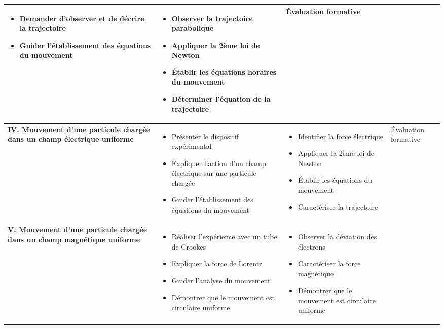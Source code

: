\documentclass[12pt]{article}
\begin{document}
\begin{table}[htbp]
\begin{tabular}{|p{4cm}|p{5.5cm}|p{5.5cm}|p{1.5cm}|}
\begin{itemize}
    \item Demander d'observer et de décrire la trajectoire
    \item Guider l'établissement des équations du mouvement
\end{itemize} & 
\begin{itemize}
    \item Observer la trajectoire parabolique
    \item Appliquer la 2ème loi de Newton
    \item Établir les équations horaires du mouvement
    \item Déterminer l'équation de la trajectoire
\end{itemize} &
Évaluation formative \\
\hline
\textbf{IV. Mouvement d'une particule chargée dans un champ électrique uniforme} & 
\begin{itemize}
    \item Présenter le dispositif expérimental
    \item Expliquer l'action d'un champ électrique sur une particule chargée
    \item Guider l'établissement des équations du mouvement
\end{itemize} & 
\begin{itemize}
    \item Identifier la force électrique
    \item Appliquer la 2ème loi de Newton
    \item Établir les équations du mouvement
    \item Caractériser la trajectoire
\end{itemize} &
Évaluation formative \\
\hline
\textbf{V. Mouvement d'une particule chargée dans un champ magnétique uniforme} & 
\begin{itemize}
    \item Réaliser l'expérience avec un tube de Crookes
    \item Expliquer la force de Lorentz
    \item Guider l'analyse du mouvement
    \item Démontrer que le mouvement est circulaire uniforme
\end{itemize} & 
\begin{itemize}
    \item Observer la déviation des électrons
    \item Caractériser la force magnétique
    \item Démontrer que le mouvement est circulaire uniforme

\end{itemize}
\end{tabular}
\end{table}
\end{document}
